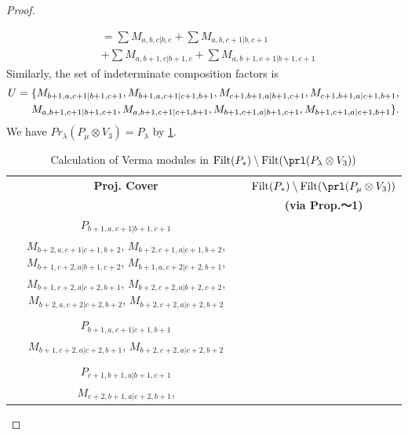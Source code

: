 \begin{proof}
\begin{enumerate}
\begin{enumerate}
\begin{equation}
\begin{aligned}
                                               &=
\sum M_{a,b,c|b,c}
+ \sum M_{a,b,c+1|b,c+1}\\
                                            &
+ \sum M_{a,b+1,c|b+1,c}
+ \sum M_{a,b+1,c+1|b+1,c+1}
          \end{aligned}
        \end{equation}
      Similarly, the set of indeterminate composition factors is 
\begin{equation}\notag
  \begin{aligned}
    U = \{
M_{b+1,a,c+1|b+1,c+1},
M_{b+1,a,c+1|c+1,b+1},
M_{c+1,b+1,a|b+1,c+1},
M_{c+1,b+1,a|c+1,b+1},\\
M_{a,b+1,c+1|b+1,c+1},
M_{a,b+1,c+1|c+1,b+1},
M_{b+1,c+1,a|b+1,c+1},
M_{b+1,c+1,a|c+1,b+1}
\}.
  \end{aligned}
\end{equation}
       We have $Pr_{\lambda}(P_\mu \otimes V_{3}) = P_\lambda  $ by \cref{tab:verma-analysis_23}.
\begin{table}[htbp]
\centering
\caption{Calculation of Verma modules in $\operatorname{Filt}(P_*) \setminus \operatorname{Filt}(\prl(P_\lambda \otimes V_{3})) $ } \label{tab:verma-analysis_23}
\begin{tabular}{cc}
\toprule
\textbf{Proj. Cover} & \textbf{$\operatorname{Filt}(P_*) \setminus \operatorname{Filt}(\prl(P_\mu \otimes V_{3})) $}  \\
     & \textbf{(via Prop.～1)}  \\
\midrule
 $P_{b+1,a,c+1|b+1,c+1}$ & \makecell{
 $M_{b+2,a,c+1|b+2,c+1}$,
 $M_{b+1,a,c+2|b+1,c+2}$,
 $M_{b+2,a,c+2|b+2,c+2}$,
 $M_{b+2,c+1,a|b+2,c+1}$, \\
 $M_{b+2,a,c+1|c+1,b+2}$,
 $M_{b+2,c+1,a|c+1,b+2}$,
 $M_{b+1,c+2,a|b+1,c+2}$,
 $M_{b+1,a,c+2|c+2,b+1}$, \\
 $M_{b+1,c+2,a|c+2,b+1}$,
 $M_{b+2,c+2,a|b+2,c+2}$,
 $M_{b+2,a,c+2|c+2,b+2}$,
 $M_{b+2,c+2,a|c+2,b+2}$
}\\
 & \\
 $P_{b+1,a,c+1|c+1,b+1}$ & \makecell{
 $M_{b+2,a,c+1|c+1,b+2}$,
 $M_{b+1,a,c+2|c+2,b+1}$,
 $M_{b+2,a,c+2|c+2,b+2}$,
 $M_{b+2,c+1,a|c+1,b+2}$, \\
 $M_{b+1,c+2,a|c+2,b+1}$,
 $M_{b+2,c+2,a|c+2,b+2}$
}\\
 & \\
 $P_{c+1,b+1,a|b+1,c+1}$ & \makecell{
 $M_{c+2,b+1,a|b+1,c+2}$,
 $M_{c+1,b+2,a|b+2,c+1}$,
 $M_{c+2,b+2,a|b+2,c+2}$,
 $M_{b+1,c+2,a|b+1,c+2}$, \\
 $M_{c+2,b+1,a|c+2,b+1}$,
}
\end{tabular}
\end{table}
\end{enumerate}
\end{enumerate}
\end{proof}
